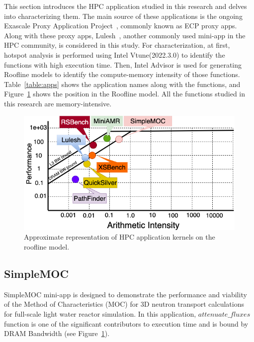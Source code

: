 
This section introduces the HPC application studied in this research and delves into characterizing them. The main source of these applications is the ongoing Exascale Proxy Application Project~\cite{ecpapp}, commonly known as ECP proxy apps. Along with these proxy apps, Lulesh~\cite{karlin2012lulesh}, another commonly used mini-app in the HPC community, is considered in this study. For characterization, at first, hotspot analysis is performed using Intel Vtune(2022.3.0) to identify the functions with high execution time. Then, Intel Advisor is used for generating Roofline models to identify the compute-memory intensity of those functions. Table~\ref{table:apps} shows the application names along with the functions, and Figure~\ref{fig:roofline} shows the position in the Roofline model. All the functions studied in this research are memory-intensive.

\begin{figure}[t]%
\begin{center}
\includegraphics[width=1\linewidth]{MEMSYS22/figures/roofline/roofline_pim.png}
\end{center}
  \vspace{-0.1in}
\caption{Approximate representation of HPC application kernels on the roofline model.}
\label{fig:roofline}
\vspace{-0.2in}
\end{figure}



\subsection{SimpleMOC}
SimpleMOC mini-app is designed to demonstrate the performance and viability of the Method of Characteristics (MOC) for 3D neutron transport calculations for full-scale
light water reactor simulation. In this application, $attenuate\_fluxes$ function is one of the significant contributors to execution time and is bound by DRAM Bandwidth (see Figure~\ref{fig:roofline}). 

